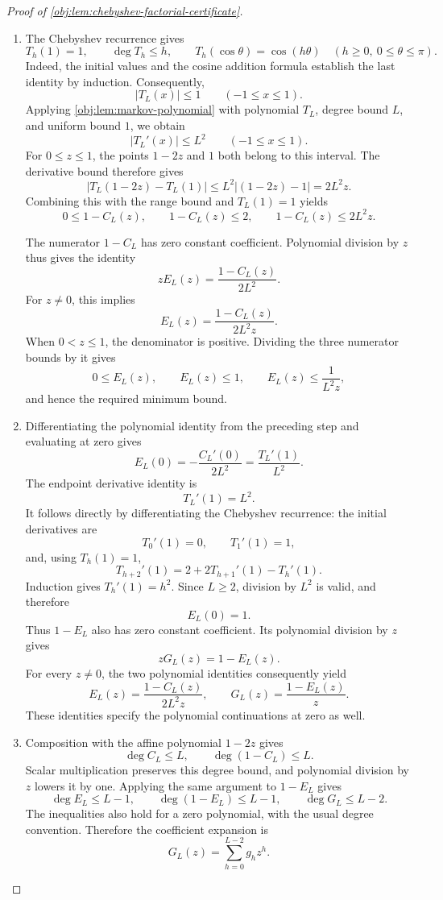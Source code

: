 \begin{proof}[Proof of \cref{obj:lem:chebyshev-factorial-certificate}]
\begin{enumerate}
\item The Chebyshev recurrence gives
\[
T_h(1)=1,\qquad \deg T_h\le h,\qquad
T_h(\cos\theta)=\cos(h\theta)
\quad(h\ge0,\ 0\le\theta\le\pi).
\]
Indeed, the initial values and the cosine addition formula establish the last identity by induction. Consequently,
\[
|T_L(x)|\le1\qquad(-1\le x\le1).
\]
Applying \cref{obj:lem:markov-polynomial} with polynomial \(T_L\), degree bound \(L\), and uniform bound \(1\), we obtain
\[
|T_L'(x)|\le L^2\qquad(-1\le x\le1).
\]
For \(0\le z\le1\), the points \(1-2z\) and \(1\) both belong to this interval. The derivative bound therefore gives
\[
|T_L(1-2z)-T_L(1)|\le L^2|(1-2z)-1|=2L^2z.
\]
Combining this with the range bound and \(T_L(1)=1\) yields
\[
0\le1-C_L(z),\qquad
1-C_L(z)\le2,\qquad
1-C_L(z)\le2L^2z.
\]

The numerator \(1-C_L\) has zero constant coefficient. Polynomial division by \(z\) thus gives the identity
\[
zE_L(z)=\frac{1-C_L(z)}{2L^2}.
\]
For \(z\ne0\), this implies
\[
E_L(z)=\frac{1-C_L(z)}{2L^2z}.
\]
When \(0<z\le1\), the denominator is positive. Dividing the three numerator bounds by it gives
\[
0\le E_L(z),\qquad
E_L(z)\le1,\qquad
E_L(z)\le\frac{1}{L^2z},
\]
and hence the required minimum bound.

\item Differentiating the polynomial identity from the preceding step and evaluating at zero gives
\[
E_L(0)=-\frac{C_L'(0)}{2L^2}
      =\frac{T_L'(1)}{L^2}.
\]
The endpoint derivative identity is
\[
T_L'(1)=L^2.
\]
It follows directly by differentiating the Chebyshev recurrence: the initial derivatives are
\[
T_0'(1)=0,\qquad T_1'(1)=1,
\]
and, using \(T_h(1)=1\),
\[
T_{h+2}'(1)=2+2T_{h+1}'(1)-T_h'(1).
\]
Induction gives \(T_h'(1)=h^2\). Since \(L\ge2\), division by \(L^2\) is valid, and therefore
\[
E_L(0)=1.
\]
Thus \(1-E_L\) also has zero constant coefficient. Its polynomial division by \(z\) gives
\[
zG_L(z)=1-E_L(z).
\]
For every \(z\ne0\), the two polynomial identities consequently yield
\[
E_L(z)=\frac{1-C_L(z)}{2L^2z},
\qquad
G_L(z)=\frac{1-E_L(z)}{z}.
\]
These identities specify the polynomial continuations at zero as well.

\item Composition with the affine polynomial \(1-2z\) gives
\[
\deg C_L\le L,\qquad \deg(1-C_L)\le L.
\]
Scalar multiplication preserves this degree bound, and polynomial division by \(z\) lowers it by one. Applying the same argument to \(1-E_L\) gives
\[
\deg E_L\le L-1,\qquad
\deg(1-E_L)\le L-1,\qquad
\deg G_L\le L-2.
\]
The inequalities also hold for a zero polynomial, with the usual degree convention. Therefore the coefficient expansion is
\[
G_L(z)=\sum_{h=0}^{L-2}g_hz^h.
\]


\end{enumerate}
\end{proof}
